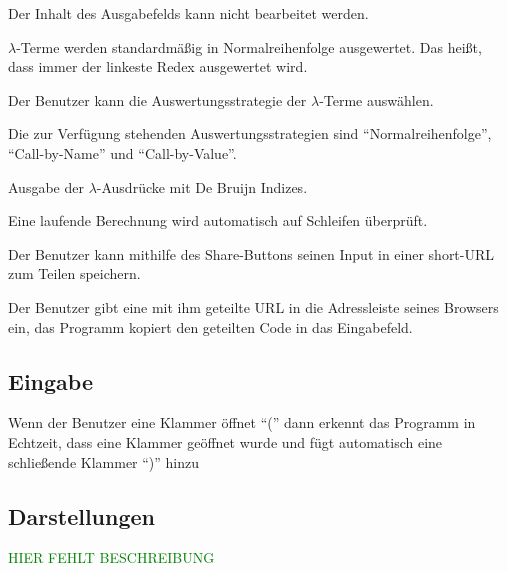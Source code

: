 \documentclass[parskip=full,11pt,twoside]{scrartcl}
\begin{document}
Der Inhalt des Ausgabefelds kann nicht bearbeitet werden.

$\lambda$-Terme werden standardmäßig in Normalreihenfolge ausgewertet.
Das heißt, dass immer der linkeste Redex ausgewertet wird.

Der Benutzer kann die Auswertungsstrategie der $\lambda$-Terme auswählen.

Die zur Verfügung stehenden Auswertungsstrategien sind \enquote{Normalreihenfolge}, \enquote{Call-by-Name} und \enquote{Call-by-Value}.

Ausgabe der $\lambda$-Ausdrücke mit De Bruijn Indizes.

Eine laufende Berechnung wird automatisch auf Schleifen überprüft.

Der Benutzer kann mithilfe des Share-Buttons seinen Input in einer short-URL zum Teilen speichern.

Der Benutzer gibt eine mit ihm geteilte URL in die Adressleiste seines Browsers ein, das Programm kopiert den geteilten Code in das Eingabefeld.



\subsection{Eingabe}

Wenn der Benutzer eine Klammer öffnet \enquote{(} dann erkennt das Programm in Echtzeit, dass eine Klammer geöffnet wurde und fügt automatisch eine schließende Klammer \enquote{)} hinzu



\subsection{Darstellungen}
\textcolor{green}{HIER FEHLT BESCHREIBUNG}
\end{document}
